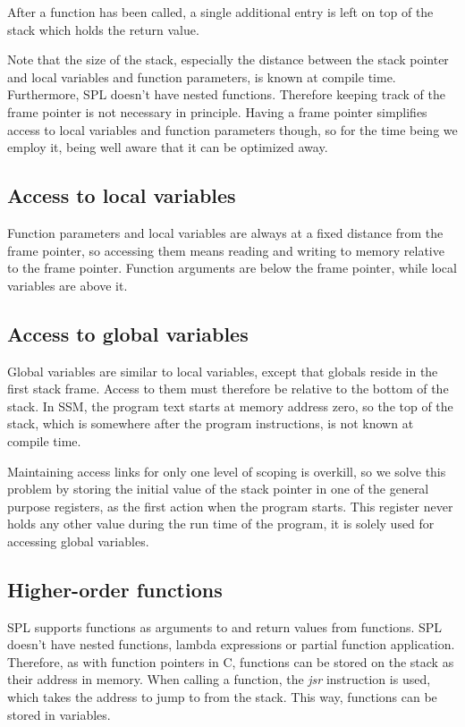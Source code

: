 \documentclass[a4paper]{article}
\begin{document}
After a function has been called, a single additional entry is left on top of
the stack which holds the return value.

Note that the size of the stack, especially the distance between the stack
pointer and local variables and function parameters, is known at compile time.
Furthermore, SPL doesn't have nested functions.  Therefore keeping track of the
frame pointer is not necessary in principle.  Having a frame pointer simplifies
access to local variables and function parameters though, so for the time being
we employ it, being well aware that it can be optimized away.


\subsection{Access to local variables}

Function parameters and local variables are always at a fixed distance from the
frame pointer, so accessing them means reading and writing to memory relative to
the frame pointer.  Function arguments are below the frame pointer, while local
variables are above it.

\subsection{Access to global variables}

Global variables are similar to local variables, except that globals reside in
the first stack frame.  Access to them must therefore be relative to the bottom
of the stack.  In SSM, the program text starts at memory address zero, so the
top of the stack, which is somewhere after the program instructions, is not
known at compile time.

Maintaining access links for only one level of scoping is overkill, so we solve
this problem by storing the initial value of the stack pointer in one of the
general purpose registers, as the first action when the program starts.  This
register never holds any other value during the run time of the program, it is
solely used for accessing global variables.

\subsection{Higher-order functions}

SPL supports functions as arguments to and return values from functions.  SPL
doesn't have nested functions, lambda expressions or partial function
application.  Therefore, as with function pointers in C, functions can be stored
on the stack as their address in memory.  When calling a function, the
\emph{jsr} instruction is used, which takes the address to jump to from the
stack.  This way, functions can be stored in variables.
\end{document}
